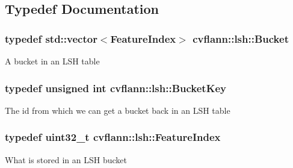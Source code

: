 \subsection{Typedef Documentation}
\hypertarget{namespacecvflann_1_1lsh_aef9e4f70918d6013ff72020141fa03d0}{
\subsubsection[{Bucket}]{\setlength{\rightskip}{0pt plus 5cm}typedef std\-::vector$<${\bf Feature\-Index}$>$ {\bf cvflann\-::lsh\-::\-Bucket}}}\label{namespacecvflann_1_1lsh_aef9e4f70918d6013ff72020141fa03d0}
A bucket in an L\-S\-H table \hypertarget{namespacecvflann_1_1lsh_a798313f0f282f24b311c4cc90e2a6619}{
\subsubsection[{Bucket\-Key}]{\setlength{\rightskip}{0pt plus 5cm}typedef unsigned int {\bf cvflann\-::lsh\-::\-Bucket\-Key}}}\label{namespacecvflann_1_1lsh_a798313f0f282f24b311c4cc90e2a6619}
The id from which we can get a bucket back in an L\-S\-H table \hypertarget{namespacecvflann_1_1lsh_a0df25a3670e022e391bb426c0bd9134d}{
\subsubsection[{Feature\-Index}]{\setlength{\rightskip}{0pt plus 5cm}typedef uint32\-\_\-t {\bf cvflann\-::lsh\-::\-Feature\-Index}}}\label{namespacecvflann_1_1lsh_a0df25a3670e022e391bb426c0bd9134d}
What is stored in an L\-S\-H bucket 

